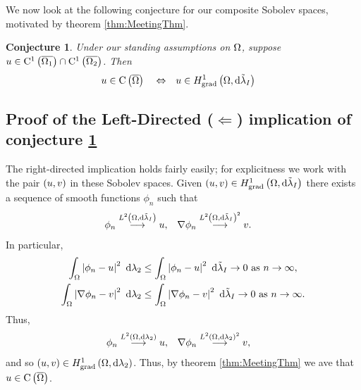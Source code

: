 \documentclass[11pt]{report}
\newtheorem{conj}[theorem]{Conjecture}
\theoremstyle{plain}
\newcommand{\tlambda}{\tilde{\lambda}}
\newcommand{\C}[1]{\mathrm{C}^1\bracs{#1}}
\begin{document}
We now look at the following conjecture for our composite Sobolev spaces, motivated by theorem \ref{thm:MeetingThm}.
\begin{conj} \label{conj:CompMeasRegularity}
	Under our standing assumptions on $\Omega$, suppose $u\in \C{\overline{\ddom_1}}\cap \C{\overline{\ddom_2}}$.
	Then
	\begin{align*}
		u\in\mathrm{C}\bracs{\overline{\ddom}} \quad\Leftrightarrow\quad & u\in\gradSob{\ddom}{\tlambda_I}
	\end{align*}
\end{conj}

\subsection*{Proof of the Left-Directed ($\Leftarrow$) implication of conjecture \ref{conj:CompMeasRegularity}}
The right-directed implication holds fairly easily; for explicitness we work with the pair $\left( u,v \right)$ in these Sobolev spaces.
Given $\bracs{u,v}\in\gradSob{\ddom}{\tlambda_I}$ there exists a sequence of smooth functions $\phi_n$ such that
\begin{align*}
	\phi_n \lconv{\ltwo{\ddom}{\tlambda_I}} u, &\quad \grad\phi_n \lconv{\ltwo{\ddom}{\tlambda_I}^2} v.
\end{align*}
In particular,
\begin{align*}
	\integral{\ddom}{\abs{\phi_n - u}^2}{\lambda_2} &\leq \integral{\ddom}{\abs{\phi_n - u}^2}{\tlambda_I} \rightarrow 0 \toInfty{n}, \\
	\integral{\ddom}{\abs{\grad\phi_n - v}^2}{\lambda_2} &\leq \integral{\ddom}{\abs{\grad\phi_n - v}^2}{\tlambda_I} \rightarrow 0 \toInfty{n}.
\end{align*}
Thus,
\begin{align*}
	\phi_n \overset{L^{2}\left( \Omega,\mathrm{d}\lambda_2 \right)}{\longrightarrow} u, &\quad \nabla\phi_n \overset{L^{2}\left( \Omega,\mathrm{d}\lambda_2 \right)^2}{\longrightarrow} v,
\end{align*}
and so $\left( u,v \right)\in H^1_\mathrm{grad}\left( \Omega, \mathrm{d}\lambda_2 \right)$.
Thus, by theorem \ref{thm:MeetingThm} we ave that $u\in\mathrm{C}\left( \overline{\Omega} \right)$. \newline
\end{document}
